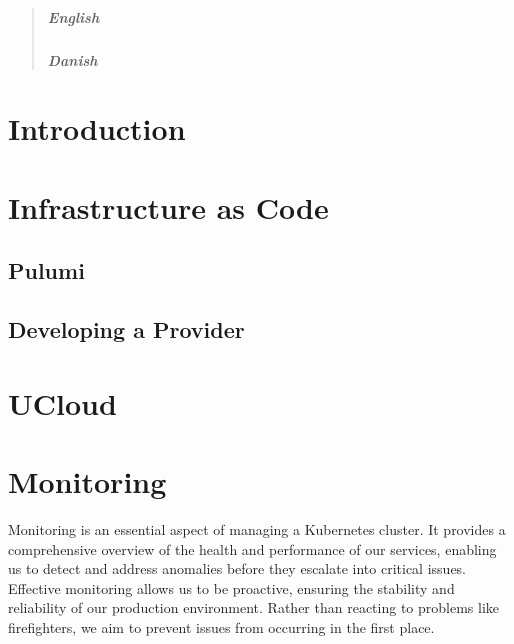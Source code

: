 
\begin{abstract}
\paragraph{English}

\paragraph{Danish}
\end{abstract}

{ \hypersetup{hidelinks} \tableofcontents {}}

\newpage
{}
\setcounter{page}{1}

\chapter{Introduction}

\chapter{Infrastructure as Code}

\section{Pulumi}

\section{Developing a Provider}

\chapter{UCloud}

\chapter{Monitoring}
Monitoring is an essential aspect of managing a Kubernetes cluster. It provides a comprehensive overview of the health and performance of our services, enabling us to detect and address anomalies before they escalate into critical issues. Effective monitoring allows us to be proactive, ensuring the stability and reliability of our production environment. Rather than reacting to problems like firefighters, we aim to prevent issues from occurring in the first place.

